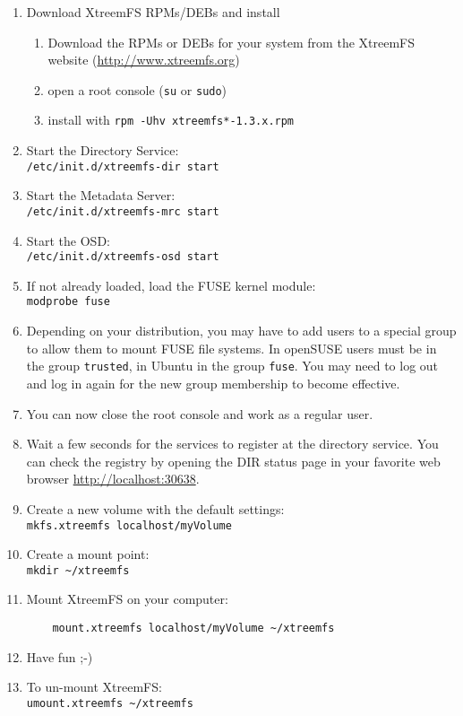 \documentclass[a4paper,10pt]{book}
\begin{document}
\begin{enumerate}
 \item Download XtreemFS RPMs/DEBs and install
	\begin{enumerate}
		\item Download the RPMs or DEBs for your system from the XtreemFS website (\href{http://www.xtreemfs.org}{http://www.xtreemfs.org})
		\item open a root console (\texttt{su} or \texttt{sudo})
		\item install with \texttt{rpm -Uhv xtreemfs*-1.3.x.rpm}
	\end{enumerate}
\item Start the Directory Service:\\
	\texttt{/etc/init.d/xtreemfs-dir start}
\item Start the Metadata Server:\\
	\texttt{/etc/init.d/xtreemfs-mrc start}
\item Start the OSD:\\
	\texttt{/etc/init.d/xtreemfs-osd start}

\item If not already loaded, load the FUSE kernel module:\\
	\texttt{modprobe fuse}

\item Depending on your distribution, you may have to add users to a special group to allow them to mount FUSE file systems. In openSUSE users must be in the group \texttt{trusted}, in Ubuntu in the group \texttt{fuse}. You may need to log out and log in again for the new group membership to become effective.

\item You can now close the root console and work as a regular user.

\item Wait a few seconds for the services to register at the directory service. You can check the registry by opening the DIR status page in your favorite web browser \href{http://localhost:30638}{http://localhost:30638}.

\item Create a new volume with the default settings:\\
	\texttt{mkfs.xtreemfs localhost/myVolume}

\item Create a mount point:\\
	\texttt{mkdir \~{}/xtreemfs}

\item Mount XtreemFS on your computer:
	\begin{verbatim}
	mount.xtreemfs localhost/myVolume ~/xtreemfs
	\end{verbatim}


\item Have fun ;-)

\item To un-mount XtreemFS:\\
	\texttt{umount.xtreemfs \~{}/xtreemfs}
\end{enumerate}
\end{document}

